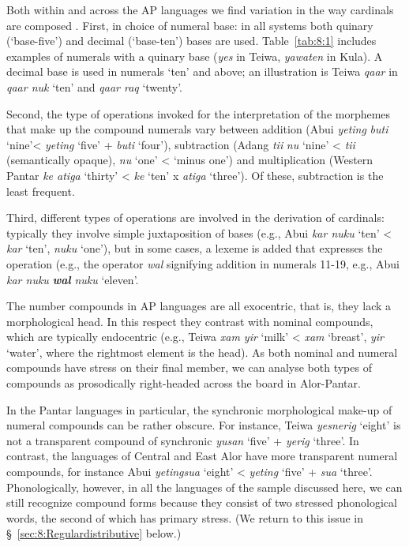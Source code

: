 Both within and across the AP languages we find variation in the way cardinals are composed \citep[cf.][]{Stump2010}. First, in choice of numeral base: in all systems both quinary (`base-five') and decimal (`base-ten') bases are used. Table~\ref{tab:8:1} includes examples of numerals with a quinary base (\textit{yes} in Teiwa, \textit{yawaten} in Kula). A decimal base is used in numerals `ten' and above; an illustration is Teiwa \textit{qaar} in \textit{qaar nuk} `ten' and \textit{qaar raq} `twenty'. 

Second, the type of operations invoked for the interpretation of the morphemes that make up the compound numerals vary between addition (Abui \textit{yeting} \textit{buti} `nine'{\textless} \textit{yeting} `five' + \textit{buti} `four'), subtraction (Adang  \textit{ti}\textit{{\textglotstop}}\textit{i} \textit{nu} `nine' {\textless} \textit{ti}\textit{{\textglotstop}}\textit{i} (semantically opaque), \textit{nu} `one' {\textless} `minus one') and multiplication (Western Pantar \textit{ke atiga} `thirty' {\textless} \textit{ke} `ten' x \textit{atiga} `three'). Of these, subtraction is the least frequent.

Third, different types of operations are involved in the derivation of cardinals: typically they involve simple juxtaposition of bases (e.g., Abui \textit{kar nuku} `ten' {\textless} \textit{kar} `ten', \textit{nuku} `one'), but in some cases, a lexeme is added that expresses the operation (e.g., the operator \textit{wal} signifying addition in numerals 11-19, e.g., Abui \textit{kar nuku} \textbf{\textit{wal}} \textit{nuku} `eleven'. 

The number compounds in AP languages are all exocentric, that is, they lack a morphological head. In this respect they contrast with nominal compounds, which are typically endocentric (e.g., Teiwa \textit{xam yir} `milk' {\textless} \textit{xam} `breast', \textit{yir} `water', where the rightmost element is the head). As both nominal and numeral compounds have stress on their final member, we can analyse both types of compounds as prosodically right-headed across the board in Alor-Pantar. 

In the Pantar languages in particular, the synchronic morphological make-up of numeral compounds can be rather obscure. For instance, Teiwa \textit{yesnerig} `eight' is not a transparent compound of synchronic \textit{yusan} `five' + \textit{yerig} `three'. In contrast, the languages of Central and East Alor have more transparent numeral compounds, for instance Abui \textit{yetingsua} `eight' {\textless} \textit{yeting} `five' + \textit{sua} `three'. Phonologically, however, in all the languages of the sample discussed here, we can still recognize compound forms because they consist of two stressed phonological words, the second of which has primary stress. (We return to this issue in {\S}~\ref{sec:8:Regulardistributive} below.) 

